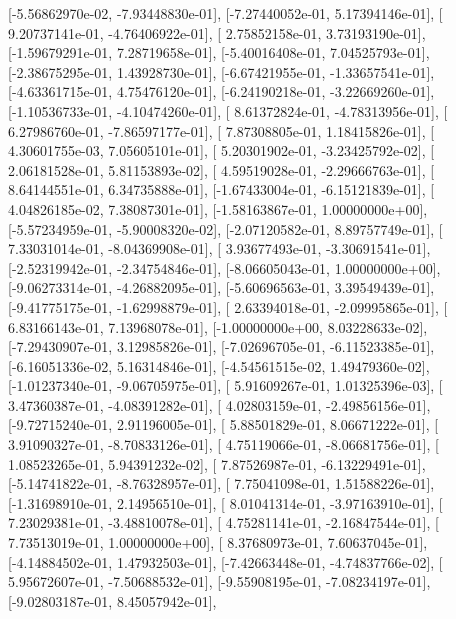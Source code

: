 \documentclass{article}
\begin{document}
       [-5.56862970e-02, -7.93448830e-01],
       [-7.27440052e-01,  5.17394146e-01],
       [ 9.20737141e-01, -4.76406922e-01],
       [ 2.75852158e-01,  3.73193190e-01],
       [-1.59679291e-01,  7.28719658e-01],
       [-5.40016408e-01,  7.04525793e-01],
       [-2.38675295e-01,  1.43928730e-01],
       [-6.67421955e-01, -1.33657541e-01],
       [-4.63361715e-01,  4.75476120e-01],
       [-6.24190218e-01, -3.22669260e-01],
       [-1.10536733e-01, -4.10474260e-01],
       [ 8.61372824e-01, -4.78313956e-01],
       [ 6.27986760e-01, -7.86597177e-01],
       [ 7.87308805e-01,  1.18415826e-01],
       [ 4.30601755e-03,  7.05605101e-01],
       [ 5.20301902e-01, -3.23425792e-02],
       [ 2.06181528e-01,  5.81153893e-02],
       [ 4.59519028e-01, -2.29666763e-01],
       [ 8.64144551e-01,  6.34735888e-01],
       [-1.67433004e-01, -6.15121839e-01],
       [ 4.04826185e-02,  7.38087301e-01],
       [-1.58163867e-01,  1.00000000e+00],
       [-5.57234959e-01, -5.90008320e-02],
       [-2.07120582e-01,  8.89757749e-01],
       [ 7.33031014e-01, -8.04369908e-01],
       [ 3.93677493e-01, -3.30691541e-01],
       [-2.52319942e-01, -2.34754846e-01],
       [-8.06605043e-01,  1.00000000e+00],
       [-9.06273314e-01, -4.26882095e-01],
       [-5.60696563e-01,  3.39549439e-01],
       [-9.41775175e-01, -1.62998879e-01],
       [ 2.63394018e-01, -2.09995865e-01],
       [ 6.83166143e-01,  7.13968078e-01],
       [-1.00000000e+00,  8.03228633e-02],
       [-7.29430907e-01,  3.12985826e-01],
       [-7.02696705e-01, -6.11523385e-01],
       [-6.16051336e-02,  5.16314846e-01],
       [-4.54561515e-02,  1.49479360e-02],
       [-1.01237340e-01, -9.06705975e-01],
       [ 5.91609267e-01,  1.01325396e-03],
       [ 3.47360387e-01, -4.08391282e-01],
       [ 4.02803159e-01, -2.49856156e-01],
       [-9.72715240e-01,  2.91196005e-01],
       [ 5.88501829e-01,  8.06671222e-01],
       [ 3.91090327e-01, -8.70833126e-01],
       [ 4.75119066e-01, -8.06681756e-01],
       [ 1.08523265e-01,  5.94391232e-02],
       [ 7.87526987e-01, -6.13229491e-01],
       [-5.14741822e-01, -8.76328957e-01],
       [ 7.75041098e-01,  1.51588226e-01],
       [-1.31698910e-01,  2.14956510e-01],
       [ 8.01041314e-01, -3.97163910e-01],
       [ 7.23029381e-01, -3.48810078e-01],
       [ 4.75281141e-01, -2.16847544e-01],
       [ 7.73513019e-01,  1.00000000e+00],
       [ 8.37680973e-01,  7.60637045e-01],
       [-4.14884502e-01,  1.47932503e-01],
       [-7.42663448e-01, -4.74837766e-02],
       [ 5.95672607e-01, -7.50688532e-01],
       [-9.55908195e-01, -7.08234197e-01],
       [-9.02803187e-01,  8.45057942e-01],
\end{document}
